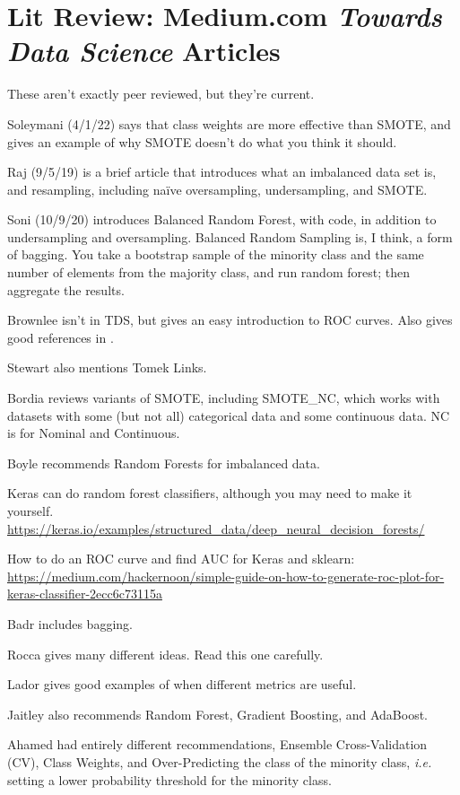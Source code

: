 \section{Lit Review:  Medium.com {\it Towards Data Science} Articles}

These aren't exactly peer reviewed, but they're current.  

Soleymani (4/1/22) says that class weights are more effective than SMOTE, and gives an example of why SMOTE doesn't do what you think it should.   
\cite{Soleymani_TDS_04_01_2022}

Raj (9/5/19) is a brief article that introduces what an imbalanced data set is, and resampling, including na\"ive oversampling, undersampling, and SMOTE.  
\cite{Raj_TDS_09_05_19}

Soni (10/9/20) introduces Balanced Random Forest, with code, in addition to undersampling and oversampling.  Balanced Random Sampling is, I think, a form of bagging.  You take a bootstrap sample of the minority class and the same number of elements from the majority class, and run random forest; then aggregate the results.  
\cite{Soni_TDS_10_09_20}

Brownlee isn't in TDS, but gives an easy introduction to ROC curves.  
\cite{Brownlee_TDS_11_26_14}
Also gives good references in \cite{Brownlee_TDS_08_19_15}.

Stewart also mentions Tomek Links.  
\cite{Stewart_TDS_07_01_22}

Bordia reviews variants of SMOTE, including SMOTE\_NC, which works with datasets with some (but not all) categorical data and some continuous data.  NC is for Nominal and Continuous.  
\cite{Bordia_TDS_02_25_22}

Boyle recommends Random Forests for imbalanced data.  
\cite{Boyle_TDS_02_03_19}

Keras can do random forest classifiers, although you may need to make it yourself.  \url{https://keras.io/examples/structured_data/deep_neural_decision_forests/}

How to do an ROC curve and find AUC for Keras and sklearn: \url{https://medium.com/hackernoon/simple-guide-on-how-to-generate-roc-plot-for-keras-classifier-2ecc6c73115a}

Badr includes bagging.  
\cite{Badr_TDS_02_22_19}

Rocca gives many different ideas.  Read this one carefully.  
\cite{Rocca_01_27_19}

Lador gives good examples of when different metrics are useful.  
\cite{Lador_TDS_09_05_17}

Jaitley also recommends Random Forest, Gradient Boosting, and AdaBoost.
\cite{Jaitley_02_01_19}

Ahamed had entirely different recommendations, Ensemble Cross-Validation (CV), Class Weights, and Over-Predicting the class of the minority class, {\it i.e.} setting a lower probability threshold for the minority class.  
\cite{Ahamed_04_15_18}

